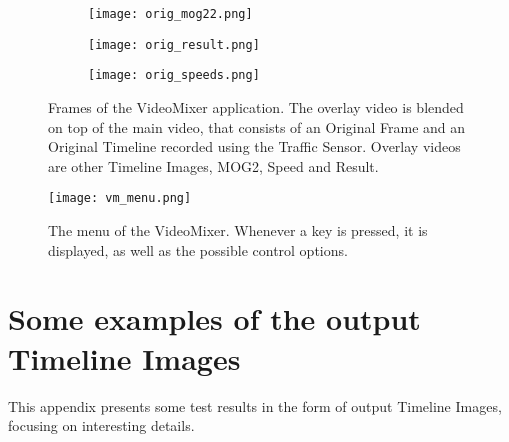 \begin{figure}[!h]
	\centering
	\begin{subfigure}[t]{0.6\textwidth}
		\texttt{[image: orig\_mog22.png]}
	\end{subfigure}
	\hfill
	\begin{subfigure}[t]{0.6\textwidth}
		\texttt{[image: orig\_result.png]}
	\end{subfigure}
	\hfill
	\begin{subfigure}[t]{0.6\textwidth}
		\texttt{[image: orig\_speeds.png]}
	\end{subfigure}

	\caption{Frames of the VideoMixer application. The overlay video is blended on top of the main video, that consists of an Original Frame and an Original Timeline recorded using the Traffic Sensor. Overlay videos are other Timeline Images, MOG2, Speed and Result.\label{fig:video_mixer_frames}}
\end{figure}

\begin{figure}[!h]
	\centering
	\texttt{[image: vm\_menu.png]}
	
	\caption{The menu of the VideoMixer. Whenever a key is pressed, it is displayed, as well as the possible control options. \label{fig:video_mixer_menu}}
\end{figure}

\clearpage\section{Some examples of the output Timeline Images}\label{app:TIs}
This appendix presents some test results in the form of output Timeline Images, focusing on interesting details.

